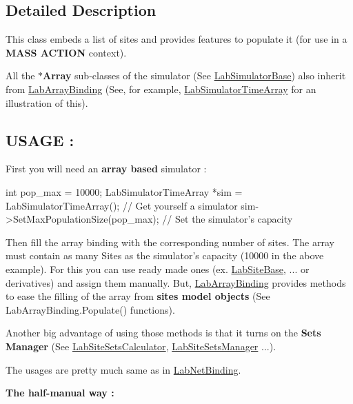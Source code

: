 \subsection{Detailed Description}
This class embeds a list of sites and provides features to populate it (for use in a {\bfseries M\+A\+S\+S A\+C\+T\+I\+O\+N} context).

All the {\bfseries $\ast$\+Array} sub-\/classes of the simulator (See \hyperlink{classelps_1_1_lab_simulator_base}{Lab\+Simulator\+Base}) also inherit from \hyperlink{classelps_1_1_lab_array_binding}{Lab\+Array\+Binding} (See, for example, \hyperlink{classelps_1_1_lab_simulator_time_array}{Lab\+Simulator\+Time\+Array} for an illustration of this).

\subsection*{U\+S\+A\+G\+E \+: }

First you will need an {\bfseries array based} simulator \+:


\begin{DoxyCode}
\textcolor{keywordtype}{int} pop\_max = 10000;
LabSimulatorTimeArray *sim = LabSimulatorTimeArray();        \textcolor{comment}{// Get yourself a simulator}
sim->SetMaxPopulationSize(pop\_max);                          \textcolor{comment}{// Set the simulator's capacity}
\end{DoxyCode}


Then fill the array binding with the corresponding number of sites. The array must contain as many Sites as the simulator's capacity (10000 in the above example). For this you can use ready made ones (ex. \hyperlink{classelps_1_1_lab_site_base}{Lab\+Site\+Base}, ... or derivatives) and assign them manually. But, \hyperlink{classelps_1_1_lab_array_binding}{Lab\+Array\+Binding} provides methods to ease the filling of the array from {\bfseries sites model objects} (See Lab\+Array\+Binding.\+Populate() functions).

Another big advantage of using those methods is that it turns on the {\bfseries Sets Manager} (See \hyperlink{classelps_1_1_lab_site_sets_calculator}{Lab\+Site\+Sets\+Calculator}, \hyperlink{classelps_1_1_lab_site_sets_manager}{Lab\+Site\+Sets\+Manager} ...).

The usages are pretty much same as in \hyperlink{classelps_1_1_lab_net_binding}{Lab\+Net\+Binding}.

{\bfseries The half-\/manual way \+:}


